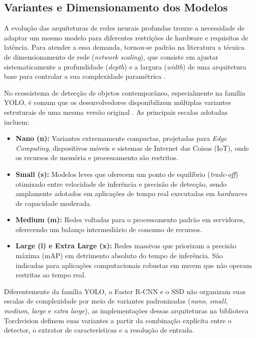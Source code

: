 \subsection{Variantes e Dimensionamento dos Modelos}

A evolução das arquiteturas de redes neurais profundas trouxe a necessidade de adaptar um
mesmo modelo para diferentes restrições de hardware e requisitos de latência. Para atender a
essa demanda, tornou-se padrão na literatura a técnica de dimensionamento de rede
(\textit{network scaling}), que consiste em ajustar sistematicamente a profundidade
(\textit{depth}) e a largura (\textit{width}) de uma arquitetura base para controlar a sua
complexidade paramétrica \cite{tan2020efficientdet}.

No ecossistema de detecção de objetos contemporâneo, especialmente na família YOLO, é comum
que os desenvolvedores disponibilizem múltiplas variantes estruturais de uma mesma versão
original \cite{ultralytics2024yolo}. As principais escalas adotadas incluem:

\begin{itemize}
    \item \textbf{Nano (n):} Variantes extremamente compactas, projetadas para
        \textit{Edge Computing}, dispositivos móveis e sistemas de Internet das Coisas (IoT),
        onde os recursos de memória e processamento são restritos.

    \item \textbf{Small (s):} Modelos leves que oferecem um ponto de equilíbrio
        (\textit{trade-off}) otimizado entre velocidade de inferência e precisão de detecção,
        sendo amplamente adotados em aplicações de tempo real executadas em
        \textit{hardwares} de capacidade moderada.

    \item \textbf{Medium (m):} Redes voltadas para o processamento padrão em servidores,
        oferecendo um balanço intermediário de consumo de recursos.

    \item \textbf{Large (l) e Extra Large (x):} Redes massivas que priorizam a precisão
        máxima (mAP) em detrimento absoluto do tempo de inferência. São indicadas para
        aplicações computacionais robustas em nuvem que não operam restritas ao tempo real.
\end{itemize}

Diferentemente da família YOLO, o Faster R-CNN e o SSD não organizam suas escalas de complexidade
por meio de variantes padronizadas (\textit{nano}, \textit{small}, \textit{medium}, \textit{large}
e \textit{extra large}), as implementações dessas arquiteturas na biblioteca Torchvision definem 
suas variantes a partir da combinação explícita entre o detector, o extrator de características e 
a resolução de entrada.

